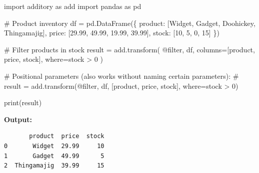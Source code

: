 \documentclass[
  letterpaper,
]{scrbook}
\newenvironment{Shaded}{\begin{snugshade}}{\end{snugshade}}
\newcommand{\BuiltInTok}[1]{\textcolor[rgb]{0.00,0.23,0.31}{#1}}
\newcommand{\CommentTok}[1]{\textcolor[rgb]{0.37,0.37,0.37}{#1}}
\newcommand{\DecValTok}[1]{\textcolor[rgb]{0.68,0.00,0.00}{#1}}
\newcommand{\FloatTok}[1]{\textcolor[rgb]{0.68,0.00,0.00}{#1}}
\newcommand{\ImportTok}[1]{\textcolor[rgb]{0.00,0.46,0.62}{#1}}
\newcommand{\NormalTok}[1]{\textcolor[rgb]{0.00,0.23,0.31}{#1}}
\newcommand{\OperatorTok}[1]{\textcolor[rgb]{0.37,0.37,0.37}{#1}}
\newcommand{\StringTok}[1]{\textcolor[rgb]{0.13,0.47,0.30}{#1}}
\begin{document}
\begin{Shaded}
\begin{Highlighting}[]
\ImportTok{import}\NormalTok{ additory }\ImportTok{as}\NormalTok{ add}
\ImportTok{import}\NormalTok{ pandas }\ImportTok{as}\NormalTok{ pd}

\CommentTok{\# Product inventory}
\NormalTok{df }\OperatorTok{=}\NormalTok{ pd.DataFrame(\{}
    \StringTok{\textquotesingle{}product\textquotesingle{}}\NormalTok{: [}\StringTok{\textquotesingle{}Widget\textquotesingle{}}\NormalTok{, }\StringTok{\textquotesingle{}Gadget\textquotesingle{}}\NormalTok{, }\StringTok{\textquotesingle{}Doohickey\textquotesingle{}}\NormalTok{, }\StringTok{\textquotesingle{}Thingamajig\textquotesingle{}}\NormalTok{],}
    \StringTok{\textquotesingle{}price\textquotesingle{}}\NormalTok{: [}\FloatTok{29.99}\NormalTok{, }\FloatTok{49.99}\NormalTok{, }\FloatTok{19.99}\NormalTok{, }\FloatTok{39.99}\NormalTok{],}
    \StringTok{\textquotesingle{}stock\textquotesingle{}}\NormalTok{: [}\DecValTok{10}\NormalTok{, }\DecValTok{5}\NormalTok{, }\DecValTok{0}\NormalTok{, }\DecValTok{15}\NormalTok{]}
\NormalTok{\})}

\CommentTok{\# Filter products in stock}
\NormalTok{result }\OperatorTok{=}\NormalTok{ add.transform(}
    \StringTok{\textquotesingle{}@filter\textquotesingle{}}\NormalTok{,}
\NormalTok{    df,}
\NormalTok{    columns}\OperatorTok{=}\NormalTok{[}\StringTok{\textquotesingle{}product\textquotesingle{}}\NormalTok{, }\StringTok{\textquotesingle{}price\textquotesingle{}}\NormalTok{, }\StringTok{\textquotesingle{}stock\textquotesingle{}}\NormalTok{],}
\NormalTok{    where}\OperatorTok{=}\StringTok{\textquotesingle{}stock \textgreater{} 0\textquotesingle{}}
\NormalTok{)}

\CommentTok{\# Positional parameters (also works without naming certain parameters):}
\CommentTok{\# result = add.transform(\textquotesingle{}@filter\textquotesingle{}, df, [\textquotesingle{}product\textquotesingle{}, \textquotesingle{}price\textquotesingle{}, \textquotesingle{}stock\textquotesingle{}], where=\textquotesingle{}stock \textgreater{} 0\textquotesingle{})}

\BuiltInTok{print}\NormalTok{(result)}
\end{Highlighting}
\end{Shaded}

\textbf{Output:}

\begin{verbatim}
       product  price  stock
0       Widget  29.99     10
1       Gadget  49.99      5
2  Thingamajig  39.99     15
\end{verbatim}
\end{document}
